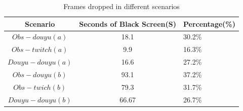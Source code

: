 \begin{table}[tb]
\centering
\caption{Frames dropped in different scenarios}
\label{tbl:drop}
{\setlength{\tabcolsep}{1pt}
\begin{tabular}{|c|c|l|}
\hline
\textbf{Scenario} & \textbf{Seconds of Black Screen(S)} & \textbf{Percentage(\%)}   \\ \hline
$Obs-douyu(a)$               & 18.1         & 30.2\%                           \\ \hline
$Obs-twitch(a)$              & 9.9        & 16.3\%                            \\ \hline
$Douyu-douyu(a)$             & 16.6      & 27.2\% \\ \hline
$Obs-douyu(b)$            & 93.1      & 37.2\%     \\ \hline
$Obs-twich(b)$             & 79.3      & 31.7\%  \\ \hline
$Douyu-douyu(b)$              & 66.67         & 26.7\%  \\ \hline
\end{tabular}}
\end{table} 